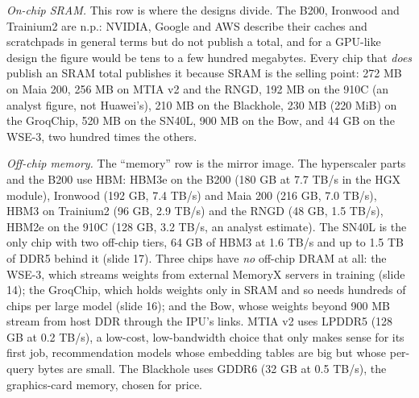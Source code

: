\documentclass[11pt,letterpaper]{article}
\begin{document}
\emph{On-chip SRAM.} This row is where the designs divide. The B200, Ironwood and Trainium2 are n.p.: NVIDIA, Google and AWS describe their caches and scratchpads in general terms but do not publish a total, and for a GPU-like design the figure would be tens to a few hundred megabytes. Every chip that \emph{does} publish an SRAM total publishes it because SRAM is the selling point: 272 MB on Maia 200, 256 MB on MTIA v2 and the RNGD, 192 MB on the 910C (an analyst figure, not Huawei's), 210 MB on the Blackhole, 230 MB (220 MiB) on the GroqChip, 520 MB on the SN40L, 900 MB on the Bow, and 44 GB on the WSE-3, two hundred times the others.

\emph{Off-chip memory.} The ``memory'' row is the mirror image. The hyperscaler parts and the B200 use HBM: HBM3e on the B200 (180 GB at 7.7 TB/s in the HGX module), Ironwood (192 GB, 7.4 TB/s) and Maia 200 (216 GB, 7.0 TB/s), HBM3 on Trainium2 (96 GB, 2.9 TB/s) and the RNGD (48 GB, 1.5 TB/s), HBM2e on the 910C (128 GB, 3.2 TB/s, an analyst estimate). The SN40L is the only chip with two off-chip tiers, 64 GB of HBM3 at 1.6 TB/s and up to 1.5 TB of DDR5 behind it (slide 17). Three chips have \emph{no} off-chip DRAM at all: the WSE-3, which streams weights from external MemoryX servers in training (slide 14); the GroqChip, which holds weights only in SRAM and so needs hundreds of chips per large model (slide 16); and the Bow, whose weights beyond 900 MB stream from host DDR through the IPU's links. MTIA v2 uses LPDDR5 (128 GB at 0.2 TB/s), a low-cost, low-bandwidth choice that only makes sense for its first job, recommendation models whose embedding tables are big but whose per-query bytes are small. The Blackhole uses GDDR6 (32 GB at 0.5 TB/s), the graphics-card memory, chosen for price.
\end{document}
